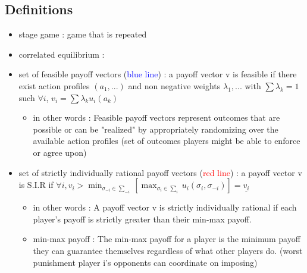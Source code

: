 \documentclass{article}
\begin{document}
\subsection{Definitions}
\begin{itemize}
    \item stage game : game that is repeated 
    \item correlated equilibrium : 
    \item set of feasible payoff vectors (\textcolor{blue}{blue line}) : a payoff vector v is feasible if there exist action profiles $(a_1,...)$ and non negative weights $\lambda_1, ...$ with $\sum\lambda_k=1$ such $\forall i$, $v_i = \sum \lambda_ku_i(a_k)$
        \begin{itemize}
            \item in other words : Feasible payoff vectors represent outcomes that are possible or can be "realized" by appropriately randomizing over the available action profiles (set of outcomes players might be able to enforce or agree upon)
        \end{itemize}
        \item set of strictly individually rational payoff vectors (\textcolor{red}{red line}) : a payoff vector v is S.I.R if $\forall i, v_i > \min_{\sigma_{-i}\in\sum_{-i}}[\max_{\sigma_i\in\sum_{i}}u_i(\sigma_i,\sigma_{-i})] = \underline{v_i}$
        \begin{itemize}
            \item in other words : A payoff vector v is strictly individually rational if each player's payoff is strictly greater than their min-max payoff.
            \item min-max payoff : The min-max payoff for a player is the minimum payoff they can guarantee themselves regardless of what other players do.  (worst punishment player i's opponents can coordinate on imposing)
        

\end{itemize}
\end{itemize}
\end{document}
